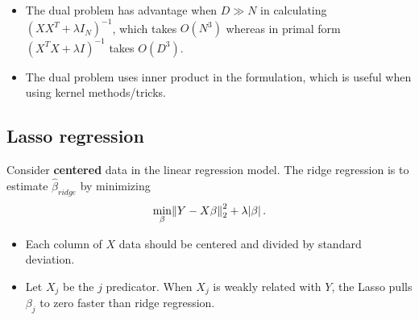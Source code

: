 \begin{refsection}
\begin{remark}\hfill
	\begin{itemize}
		\item The dual problem has advantage when $D\gg N$ in calculating $(XX^T + \lambda I_N)^{-1}$, which takes $O(N^3)$ whereas in primal form $(X^TX + \lambda I)^{-1}$ takes $O(D^3)$.
		\item The dual problem uses inner product in the formulation, which is useful when using kernel methods/tricks. 
	\end{itemize}
\end{remark}



\subsection{Lasso regression}

\begin{definition}
	Consider \textbf{centered} data in the linear regression model. The ridge regression is to estimate $\hat{\beta}_{ridge}$ by minimizing
	$$\min_{\beta} \norm{Y - X\beta}_2^2 + \lambda \abs{\beta}.$$
\end{definition}


\begin{remark}\hfill
	\begin{itemize}
		\item Each column of $X$ data should be centered and divided by standard deviation.  
	\end{itemize}
\end{remark}

\begin{remark}\hfill
	\begin{itemize}
		\item Let $X_j$ be the $j$ predicator. When $X_j$ is weakly related with $Y$, the Lasso pulls $\beta_j$ to zero faster than ridge regression.
	\end{itemize}
\end{remark}








\begin{lemma}
	

\end{lemma}
\end{refsection}
